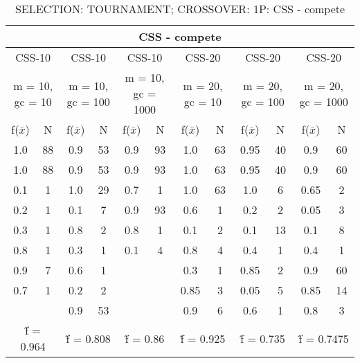 \begin{table}[H]
	\centering
	\caption{SELECTION: TOURNAMENT; CROSSOVER: 1P: CSS - compete}
	\begin{adjustbox}{width=1\textwidth}
		\begin{tabular}{ |c|c||c|c||c|c||c|c||c|c||c|c| }
			\hline
			\multicolumn{12}{|c|}{CSS - compete} \\
			\hline
			\multicolumn{2}{|c||}{CSS-10} & \multicolumn{2}{c||}{CSS-10} & \multicolumn{2}{c||}{CSS-10} & \multicolumn{2}{c||}{CSS-20} & \multicolumn{2}{c||}{CSS-20} & \multicolumn{2}{c|}{CSS-20}\\
			\hline
			\multicolumn{2}{|c||}{m = 10, gc = 10} & \multicolumn{2}{c||}{m = 10, gc = 100} & \multicolumn{2}{c||}{m = 10, gc = 1000} & \multicolumn{2}{c||}{m = 20, gc = 10} & \multicolumn{2}{c||}{m = 20, gc = 100} & \multicolumn{2}{c|}{m = 20, gc = 1000}\\
			\hline
			f($\bar{x}$) & N & f($\bar{x}$) & N & f($\bar{x}$) & N & f($\bar{x}$) & N & f($\bar{x}$) & N & f($\bar{x}$) & N\\
			\hline
			\hline
			1.0 & 88 & 0.9 & 53 & 0.9 & 93 & 1.0 & 63 & 0.95 & 40 & 0.9 & 60\\
			\hline
			1.0 & 88 & 0.9 & 53 & 0.9 & 93 & 1.0 & 63 & 0.95 & 40 & 0.9 & 60\\
			0.1 & 1 & 1.0 & 29 & 0.7 & 1 & 1.0 & 63 & 1.0 & 6 & 0.65 & 2\\
			0.2 & 1 & 0.1 & 7 & 0.9 & 93 & 0.6 & 1 & 0.2 & 2 & 0.05 & 3\\
			0.3 & 1 & 0.8 & 2 & 0.8 & 1 & 0.1 & 2 & 0.1 & 13 & 0.1 & 8\\
			0.8 & 1 & 0.3 & 1 & 0.1 & 4 & 0.8 & 4 & 0.4 & 1 & 0.4 & 1\\
			0.9 & 7 & 0.6 & 1 &   &   & 0.3 & 1 & 0.85 & 2 & 0.9 & 60\\
			0.7 & 1 & 0.2 & 2 &   &   & 0.85 & 3 & 0.05 & 5 & 0.85 & 14\\
			&   & 0.9 & 53 &   &   & 0.9 & 6 & 0.6 & 1 & 0.8 & 3\\
			\hline
			\multicolumn{2}{|c||}{\^{f} = 0.964} & \multicolumn{2}{c||}{\^{f} = 0.808} & \multicolumn{2}{c||}{\^{f} = 0.86} & \multicolumn{2}{c||}{\^{f} = 0.925} & \multicolumn{2}{c||}{\^{f} = 0.735} & \multicolumn{2}{c|}{\^{f} = 0.7475}\\
			\hline
		\end{tabular}
	\end{adjustbox}
\end{table}

